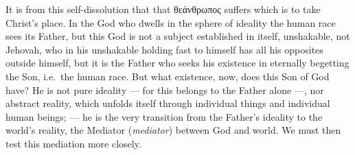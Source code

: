 \documentclass[12pt]{book}
\newcommand{\opage}[1]{\marginnote{\footnotesize\textit{[#1]}}}
\begin{document}
It is from this self-dissolution that that θεάνθρωπος suffers which is to take
Christ's place. In the God who dwells in the sphere of ideality the human race
sees its Father, but this God is not a subject established in itself,
unshakable, not Jehovah, who in his unshakable holding fast to himself has all
his opposites outside himself, but it is the Father who seeks his existence in
eternally begetting the Son, i.e.\ the human race. But what existence, now,
does this Son of God have? He is not pure ideality --- for this belongs to the
Father alone ---, nor abstract reality, which unfolds itself through individual
things and individual human beings; --- he is the very transition from the
Father's ideality to the world's reality,
\opage{140} the Mediator (\textit{mediator}) between God and world. We must then
test this mediation more closely.
\end{document}
